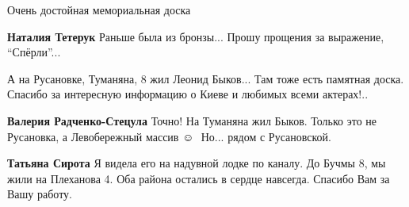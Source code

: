  
 
 
 
 



Очень достойная мемориальная доска

\textbf{Наталия Тетерук} Раньше была из бронзы... Прошу прощения за выражение, \enquote{Спёрли}...


А на Русановке, Туманяна, 8 жил Леонид Быков... Там тоже есть памятная доска.
Спасибо за интересную информацию о Киеве и любимых всеми актерах!..

\textbf{Валерия Радченко-Стецула} Точно! На Туманяна жил Быков.
Только это не Русановка, а Левобережный массив ☺ ️ 
Но... рядом с Русановской.

\textbf{Татьяна Сирота}
Я видела его на надувной лодке по каналу.
До Бучмы 8, мы жили на Плеханова 4.
Оба района остались в сердце навсегда.
Спасибо Вам за Вашу работу.
